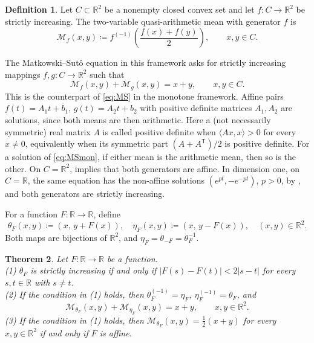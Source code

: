 \documentclass[a4paper, reqno, 11pt]{amsart}
\newtheorem{Thm}{Theorem}[section]
\theoremstyle{definition}
\newtheorem{Def}[Thm]{Definition}
\begin{document}
\begin{Def}\label{def:vqam}
Let $C \subset \mathbb{R}^2$ be a nonempty closed convex set and let $f \colon C \to \mathbb{R}^2$ be strictly increasing.
The two-variable quasi-arithmetic mean with generator $f$ is
\begin{equation*}
\mathcal{M}_f(x,y) \coloneqq f^{(-1)}\left(\frac{f(x)+f(y)}{2}\right), \qquad x,y \in C .
\end{equation*}
\end{Def}

The Matkowski--Sut\^o equation in this framework asks for strictly increasing mappings $f, g \colon C \to \mathbb{R}^2$ such that
\begin{equation}\label{eq:MSmon}
\mathcal{M}_f(x,y) + \mathcal{M}_g(x,y) = x+y, \qquad x,y \in C .
\end{equation}
This is the counterpart of \eqref{eq:MS} in the monotone framework.
Affine pairs $f(t) = A_1 t + b_1$, $g(t) = A_2 t + b_2$ with positive definite matrices $A_1, A_2$ are solutions, since both means are then arithmetic. 
Here a (not necessarily symmetric) real matrix $A$ is called positive definite when $\langle Ax,x\rangle > 0$ for every $x \neq 0$, equivalently when its symmetric part $(A+A^{\mathsf T})/2$ is positive definite. 
For a solution of \eqref{eq:MSmon}, if either mean is the arithmetic mean, then so is the other. 
On $C=\mathbb{R}^2$,  \cite[Theorem 4]{Toth} implies that both generators are affine. 
In dimension one, on $C = \mathbb{R}$, the same equation has the non-affine solutions $(e^{pt}, -e^{-pt})$, $p > 0$, by \cite{DP}, and both generators are strictly increasing.

For a function $F \colon \mathbb{R} \to \mathbb{R}$, define
\begin{equation}\label{eq:shear}
\theta_F(x,y) \coloneqq  ( x, \, y + F(x) ), \quad \eta_F(x,y) \coloneqq  ( x, \, y - F(x) ), \quad (x,y) \in \mathbb{R}^2 .
\end{equation}
Both maps are bijections of $\mathbb{R}^2$, and $\eta_F = \theta_{-F} = \theta_{F}^{-1}$.

\begin{Thm}\label{thm:shear}
Let $F \colon \mathbb{R} \to \mathbb{R}$ be a function. \\
(1) $\theta_F$ is strictly increasing if and only if $|F(s) - F(t)| < 2|s - t|$ for every $s, t \in \mathbb{R}$ with $s \neq t$. \\
(2) If the condition in (1) holds, then $\theta_F^{(-1)} = \eta_F$, $\eta_F^{(-1)} = \theta_F$, and
\begin{equation*}
\mathcal{M}_{\theta_F}(x,y) + \mathcal{M}_{\eta_F}(x,y) = x+y, \qquad x,y \in \mathbb{R}^2 .
\end{equation*}
(3) If the condition in (1) holds, then $\mathcal{M}_{\theta_F}(x,y) = \tfrac{1}{2}(x+y)$ for every $x, y \in \mathbb{R}^2$ if and only if $F$ is affine.
\end{Thm}
\end{document}
